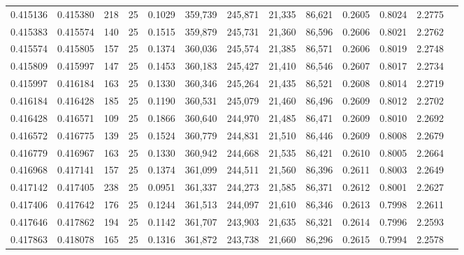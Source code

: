\begin{tabular}{rrrrrrrrrrrrr}
0.415136 & 0.415380 &   218 &  25 &                                     0.1029 & 359,739 & 245,871 &  21,335 &  86,621 & 0.2605 & 0.8024 & 2.2775 \\
0.415383 & 0.415574 &   140 &  25 &                                     0.1515 & 359,879 & 245,731 &  21,360 &  86,596 & 0.2606 & 0.8021 & 2.2762 \\
0.415574 & 0.415805 &   157 &  25 &                                     0.1374 & 360,036 & 245,574 &  21,385 &  86,571 & 0.2606 & 0.8019 & 2.2748 \\
0.415809 & 0.415997 &   147 &  25 &                                     0.1453 & 360,183 & 245,427 &  21,410 &  86,546 & 0.2607 & 0.8017 & 2.2734 \\
0.415997 & 0.416184 &   163 &  25 &                                     0.1330 & 360,346 & 245,264 &  21,435 &  86,521 & 0.2608 & 0.8014 & 2.2719 \\
0.416184 & 0.416428 &   185 &  25 &                                     0.1190 & 360,531 & 245,079 &  21,460 &  86,496 & 0.2609 & 0.8012 & 2.2702 \\
0.416428 & 0.416571 &   109 &  25 &                                     0.1866 & 360,640 & 244,970 &  21,485 &  86,471 & 0.2609 & 0.8010 & 2.2692 \\
0.416572 & 0.416775 &   139 &  25 &                                     0.1524 & 360,779 & 244,831 &  21,510 &  86,446 & 0.2609 & 0.8008 & 2.2679 \\
0.416779 & 0.416967 &   163 &  25 &                                     0.1330 & 360,942 & 244,668 &  21,535 &  86,421 & 0.2610 & 0.8005 & 2.2664 \\
0.416968 & 0.417141 &   157 &  25 &                                     0.1374 & 361,099 & 244,511 &  21,560 &  86,396 & 0.2611 & 0.8003 & 2.2649 \\
0.417142 & 0.417405 &   238 &  25 &                                     0.0951 & 361,337 & 244,273 &  21,585 &  86,371 & 0.2612 & 0.8001 & 2.2627 \\
0.417406 & 0.417642 &   176 &  25 &                                     0.1244 & 361,513 & 244,097 &  21,610 &  86,346 & 0.2613 & 0.7998 & 2.2611 \\
0.417646 & 0.417862 &   194 &  25 &                                     0.1142 & 361,707 & 243,903 &  21,635 &  86,321 & 0.2614 & 0.7996 & 2.2593 \\
0.417863 & 0.418078 &   165 &  25 &                                     0.1316 & 361,872 & 243,738 &  21,660 &  86,296 & 0.2615 & 0.7994 & 2.2578 \\

\end{tabular}

